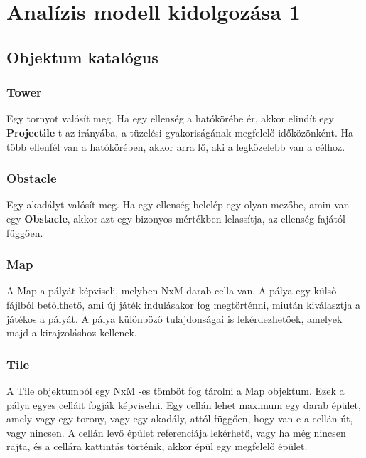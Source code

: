 %
\chapter{Analízis modell kidolgozása 1}

\thispagestyle{fancy}

\section{Objektum katalógus}


\subsection{Tower}
Egy tornyot valósít meg. Ha egy ellenség a hatókörébe ér, akkor elindít egy \textbf{Projectile}-t az irányába, a tüzelési gyakoriságának megfelelő időközönként. Ha több ellenfél van a hatókörében, akkor arra lő, aki a legközelebb van a célhoz.

\subsection{Obstacle}
Egy akadályt valósít meg. Ha egy ellenség belelép egy olyan mezőbe, amin van egy \textbf{Obstacle}, akkor azt egy bizonyos mértékben lelassítja, az ellenség fajától függően.

\subsection{Map}
A Map a pályát képviseli, melyben NxM darab cella van. A pálya egy külső fájlból betölthető, ami új játék indulásakor fog megtörténni, miután kiválasztja a játékos a pályát. A pálya különböző tulajdonságai is lekérdezhetőek, amelyek majd a kirajzoláshoz kellenek.

\subsection{Tile}
A Tile objektumból egy NxM -es tömböt fog tárolni a Map objektum. Ezek a pálya egyes celláit fogják képviselni. Egy cellán lehet maximum egy darab épület, amely vagy egy torony, vagy egy akadály, attól függően, hogy van-e a cellán út, vagy nincsen. A cellán levő épület referenciája lekérhető, vagy ha még nincsen rajta, és a cellára kattintás történik, akkor épül egy megfelelő épület.

